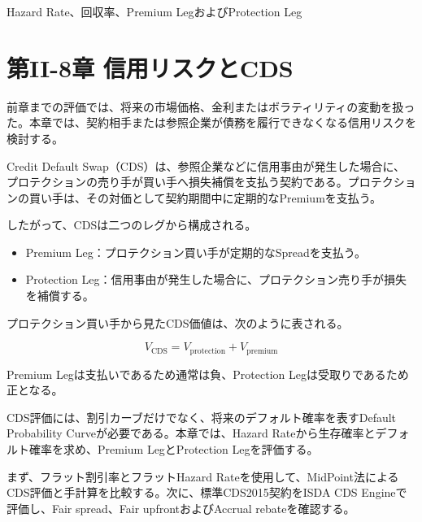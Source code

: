\documentclass[
  letterpaper,
  DIV=11,
  numbers=noendperiod]{scrreprt}
\newenvironment{Shaded}{\begin{snugshade}}{\end{snugshade}}
\newcommand{\AttributeTok}[1]{\textcolor[rgb]{0.40,0.45,0.13}{#1}}
\newcommand{\ConstantTok}[1]{\textcolor[rgb]{0.56,0.35,0.01}{#1}}
\newcommand{\FunctionTok}[1]{\textcolor[rgb]{0.28,0.35,0.67}{#1}}
\newcommand{\NormalTok}[1]{\textcolor[rgb]{0.00,0.23,0.31}{#1}}
\newcommand{\SpecialCharTok}[1]{\textcolor[rgb]{0.37,0.37,0.37}{#1}}
\newcommand{\StringTok}[1]{\textcolor[rgb]{0.13,0.47,0.30}{#1}}
\providecommand{\tightlist}{%
  \setlength{\itemsep}{0pt}\setlength{\parskip}{0pt}}
\begin{document}
Hazard Rate、回収率、Premium LegおよびProtection Leg

\hfill\break

\chapter{第II-8章
信用リスクとCDS}\label{ux7b2cii-8ux7ae0-ux4fe1ux7528ux30eaux30b9ux30afux3068cds-1}

前章までの評価では、将来の市場価格、金利またはボラティリティの変動を扱った。本章では、契約相手または参照企業が債務を履行できなくなる信用リスクを検討する。

Credit Default
Swap（CDS）は、参照企業などに信用事由が発生した場合に、プロテクションの売り手が買い手へ損失補償を支払う契約である。プロテクションの買い手は、その対価として契約期間中に定期的なPremiumを支払う。

したがって、CDSは二つのレグから構成される。

\begin{itemize}
\tightlist
\item
  Premium Leg：プロテクション買い手が定期的なSpreadを支払う。
\item
  Protection
  Leg：信用事由が発生した場合に、プロテクション売り手が損失を補償する。
\end{itemize}

プロテクション買い手から見たCDS価値は、次のように表される。

\[
V_{\mathrm{CDS}}
=
V_{\mathrm{protection}}
+
V_{\mathrm{premium}}
\]

Premium Legは支払いであるため通常は負、Protection
Legは受取りであるため正となる。

CDS評価には、割引カーブだけでなく、将来のデフォルト確率を表すDefault
Probability Curveが必要である。本章では、Hazard
Rateから生存確率とデフォルト確率を求め、Premium LegとProtection
Legを評価する。

まず、フラット割引率とフラットHazard
Rateを使用して、MidPoint法によるCDS評価と手計算を比較する。次に、標準CDS2015契約をISDA
CDS Engineで評価し、Fair spread、Fair upfrontおよびAccrual
rebateを確認する。

\begin{Shaded}
\end{Shaded}
\end{document}
